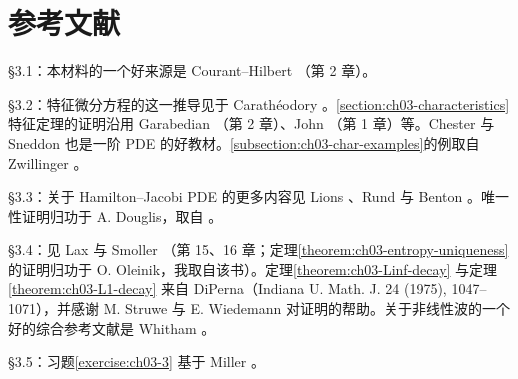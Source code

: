 \documentclass[../../main.tex]{subfiles}
\begin{document}
\section{参考文献}\label{section:ch03-references}

\S3.1：本材料的一个好来源是 Courant--Hilbert \cite{C-H}（第 2 章）。

\S3.2：特征微分方程的这一推导见于 Carath\'eodory \cite{C}。\cref{section:ch03-characteristics} 特征定理的证明沿用 Garabedian \cite{G}（第 2 章）、John \cite{J2}（第 1 章）等。Chester \cite{Ch} 与 Sneddon \cite{Sn} 也是一阶 PDE 的好教材。\cref{subsection:ch03-char-examples}的例取自 Zwillinger \cite{Zw}。

\S3.3：关于 Hamilton--Jacobi PDE 的更多内容见 Lions \cite{Li}、Rund \cite{Ru} 与 Benton \cite{Be}。唯一性证明归功于 A. Douglis，取自 \cite{Be}。

\S3.4：见 Lax \cite{Lx1} 与 Smoller \cite{S}（第 15、16 章；定理\cref{theorem:ch03-entropy-uniqueness} 的证明归功于 O. Oleinik，我取自该书）。定理\cref{theorem:ch03-Linf-decay} 与定理\cref{theorem:ch03-L1-decay} 来自 DiPerna（Indiana U. Math. J. 24 (1975), 1047--1071），并感谢 M. Struwe 与 E. Wiedemann 对证明的帮助。关于非线性波的一个好的综合参考文献是 Whitham \cite{Wh}。

\S3.5：习题\cref{exercise:ch03-3} 基于 Miller \cite{Mi}。
\end{document}
